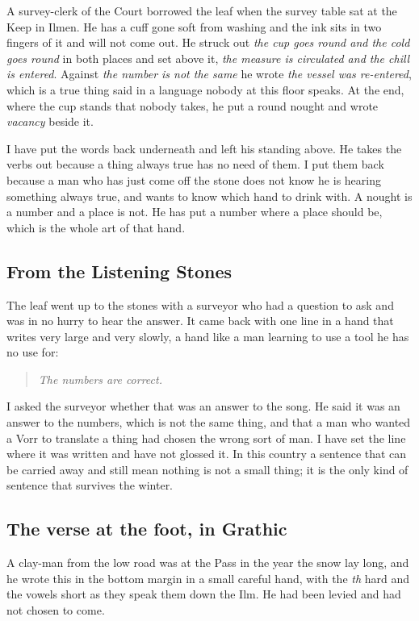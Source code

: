 \documentclass{design/chronicle}
\begin{document}
A survey-clerk of the Court borrowed the leaf when the survey table sat at the Keep in Ilmen. He has a cuff gone soft from washing and the ink sits in two fingers of it and will not come out. He struck out \emph{the cup goes round and the cold goes round} in both places and set above it, \emph{the measure is circulated and the chill is entered}. Against \emph{the number is not the same} he wrote \emph{the vessel was re-entered}, which is a true thing said in a language nobody at this floor speaks. At the end, where the cup stands that nobody takes, he put a round nought and wrote \emph{vacancy} beside it.

I have put the words back underneath and left his standing above. He takes the verbs out because a thing always true has no need of them. I put them back because a man who has just come off the stone does not know he is hearing something always true, and wants to know which hand to drink with. A nought is a number and a place is not. He has put a number where a place should be, which is the whole art of that hand.

\subsection*{From the Listening Stones}

The leaf went up to the stones with a surveyor who had a question to ask and was in no hurry to hear the answer. It came back with one line in a hand that writes very large and very slowly, a hand like a man learning to use a tool he has no use for:

\begin{quote}\itshape The numbers are correct.\end{quote}

I asked the surveyor whether that was an answer to the song. He said it was an answer to the numbers, which is not the same thing, and that a man who wanted a Vorr to translate a thing had chosen the wrong sort of man. I have set the line where it was written and have not glossed it. In this country a sentence that can be carried away and still mean nothing is not a small thing; it is the only kind of sentence that survives the winter.

\subsection*{The verse at the foot, in Grathic}

A clay-man from the low road was at the Pass in the year the snow lay long, and he wrote this in the bottom margin in a small careful hand, with the \emph{th} hard and the vowels short as they speak them down the Ilm. He had been levied and had not chosen to come.
\end{document}
